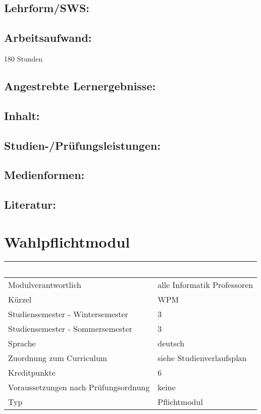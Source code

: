 \section*{Lehrform/SWS:}\label{lehrformsws-6}

\section*{Arbeitsaufwand:}\label{arbeitsaufwand-6}

180 Stunden

\section*{Angestrebte
Lernergebnisse:}\label{angestrebte-lernergebnisse-6}

\section*{Inhalt:}\label{inhalt-6}

\section*{Studien-/Prüfungsleistungen:}\label{studien-pruxfcfungsleistungen-6}

\section*{Medienformen:}\label{medienformen-6}

\section*{Literatur:}\label{literatur-6}

\chapter{Wahlpflichtmodul}\label{wahlpflichtmodul-1}

\begin{longtable}[]{@{}ll@{}}
\toprule
~ & ~\tabularnewline
\midrule
\endhead
Modulverantwortlich & alle Informatik Professoren\tabularnewline
Kürzel & WPM\tabularnewline
Studiensemester - Wintersemester & 3\tabularnewline
Studiensemester - Sommersemester & 3\tabularnewline
Sprache & deutsch\tabularnewline
Zuordnung zum Curriculum & siehe Studienverlaufsplan\tabularnewline
Kreditpunkte & 6\tabularnewline
Voraussetzungen nach Prüfungsordnung & keine\tabularnewline
Typ & Pflichtmodul\tabularnewline
\bottomrule
\end{longtable}

